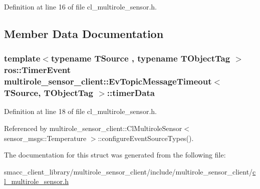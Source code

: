 Definition at line 16 of file cl\+\_\+multirole\+\_\+sensor.\+h.



\subsection{Member Data Documentation}
\subsubsection[{\texorpdfstring{timer\+Data}{timerData}}]{\setlength{\rightskip}{0pt plus 5cm}template$<$typename T\+Source , typename T\+Object\+Tag $>$ ros\+::\+Timer\+Event {\bf multirole\+\_\+sensor\+\_\+client\+::\+Ev\+Topic\+Message\+Timeout}$<$ T\+Source, T\+Object\+Tag $>$\+::timer\+Data}\hypertarget{structmultirole__sensor__client_1_1EvTopicMessageTimeout_acf6851104497bd60ac389051f5b4f2b0}{}\label{structmultirole__sensor__client_1_1EvTopicMessageTimeout_acf6851104497bd60ac389051f5b4f2b0}


Definition at line 18 of file cl\+\_\+multirole\+\_\+sensor.\+h.



Referenced by multirole\+\_\+sensor\+\_\+client\+::\+Cl\+Multirole\+Sensor$<$ sensor\+\_\+msgs\+::\+Temperature $>$\+::configure\+Event\+Source\+Types().



The documentation for this struct was generated from the following file\+:\begin{DoxyCompactItemize}
\item 
smacc\+\_\+client\+\_\+library/multirole\+\_\+sensor\+\_\+client/include/multirole\+\_\+sensor\+\_\+client/\hyperlink{cl__multirole__sensor_8h}{cl\+\_\+multirole\+\_\+sensor.\+h}\end{DoxyCompactItemize}
